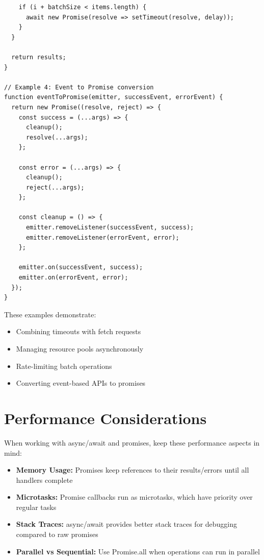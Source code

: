 \documentclass[12pt,letterpaper]{article}
\newenvironment{macterminal}{%
    \begin{mdframed}[
        linecolor=terminalFrame,
        backgroundcolor=terminalBg,
        roundcorner=5pt,
        skipabove=5pt,
        skipbelow=5pt,
        linewidth=1pt,
        innertopmargin=5pt,
        frametitle={%
            \tikz[baseline=(current bounding box.east), outer sep=0pt]{
                \fill[red!80!black] (0,0) circle (5pt);
                \fill[yellow!80!black] (0.7,0) circle (5pt);
                \fill[green!70!black] (1.4,0) circle (5pt);
            }
        },
        frametitlealignment=\raggedright,
        frametitleaboveskip=8pt,
        frametitlebelowskip=0pt,
    ]
}{%
    \end{mdframed}%
}
\begin{document}
\begin{macterminal}
\begin{lstlisting}
    if (i + batchSize < items.length) {
      await new Promise(resolve => setTimeout(resolve, delay));
    }
  }
  
  return results;
}

// Example 4: Event to Promise conversion
function eventToPromise(emitter, successEvent, errorEvent) {
  return new Promise((resolve, reject) => {
    const success = (...args) => {
      cleanup();
      resolve(...args);
    };
    
    const error = (...args) => {
      cleanup();
      reject(...args);
    };
    
    const cleanup = () => {
      emitter.removeListener(successEvent, success);
      emitter.removeListener(errorEvent, error);
    };
    
    emitter.on(successEvent, success);
    emitter.on(errorEvent, error);
  });
}
\end{lstlisting}
\end{macterminal}

These examples demonstrate:
\begin{itemize}
    \item Combining timeouts with fetch requests
    \item Managing resource pools asynchronously
    \item Rate-limiting batch operations
    \item Converting event-based APIs to promises
\end{itemize}

\section{Performance Considerations}

When working with async/await and promises, keep these performance aspects in mind:

\begin{itemize}
    \item \textbf{Memory Usage:} Promises keep references to their results/errors until all handlers complete
    \item \textbf{Microtasks:} Promise callbacks run as microtasks, which have priority over regular tasks
    \item \textbf{Stack Traces:} async/await provides better stack traces for debugging compared to raw promises
    \item \textbf{Parallel vs Sequential:} Use Promise.all when operations can run in parallel
\end{itemize}
\end{document}
